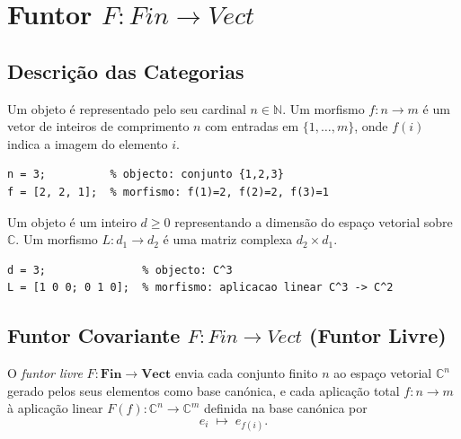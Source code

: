 \section{Funtor \texorpdfstring{$F: Fin \to Vect$}{F: Fin -> Vect}}
\label{sec:functor-fin-vect}

\subsection{Descrição das Categorias}

\begin{definition}
Um objeto é representado pelo seu cardinal $n \in \mathbb{N}$. Um morfismo $f: n \to m$ é um vetor de inteiros de comprimento $n$ com entradas em $\{1,\ldots,m\}$, onde $f(i)$ indica a imagem do elemento $i$.
\end{definition}

\begin{lstlisting}[style=matlab, caption={Objeto e morfismo em $\mathbf{Fin}$}]
n = 3;          % objecto: conjunto {1,2,3}
f = [2, 2, 1];  % morfismo: f(1)=2, f(2)=2, f(3)=1
\end{lstlisting}

\begin{definition}
Um objeto é um inteiro $d \geq 0$ representando a dimensão do espaço vetorial sobre $\mathbb{C}$. Um morfismo $L: d_1 \to d_2$ é uma matriz complexa $d_2 \times d_1$.
\end{definition}

\begin{lstlisting}[style=matlab, caption={Objeto e morfismo em $\mathbf{Vect}$}]
d = 3;               % objecto: C^3
L = [1 0 0; 0 1 0];  % morfismo: aplicacao linear C^3 -> C^2
\end{lstlisting}

\subsection{Funtor Covariante \texorpdfstring{$F: Fin \to Vect$}{F: Fin -> Vect} (Funtor Livre)}

O \emph{funtor livre} $F: \mathbf{Fin} \to \mathbf{Vect}$ envia cada conjunto finito $n$ ao espaço vetorial $\mathbb{C}^n$ gerado pelos seus elementos como base canónica, e cada aplicação total $f: n \to m$ à aplicação linear $F(f): \mathbb{C}^n \to \mathbb{C}^m$ definida na base canónica por
\[
    e_i \;\longmapsto\; e_{f(i)}.
\]

